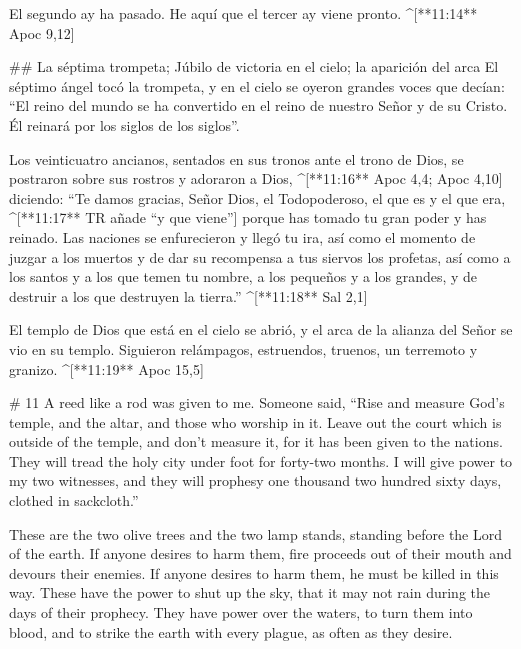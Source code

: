 \begin{paracols}{2}
 El segundo ay ha pasado. He aquí que el tercer ay viene pronto. ^[**11:14** Apoc 9,12]

## La séptima trompeta; Júbilo de victoria en el cielo; la aparición del arca
 El séptimo ángel tocó la trompeta, y en el cielo se oyeron grandes voces que decían: “El reino del mundo se ha convertido en el reino de nuestro Señor y de su Cristo. Él reinará por los siglos de los siglos”.

 Los veinticuatro ancianos, sentados en sus tronos ante el trono de Dios, se postraron sobre sus rostros y adoraron a Dios, ^[**11:16** Apoc 4,4; Apoc 4,10]  diciendo: “Te damos gracias, Señor Dios, el Todopoderoso, el que es y el que era, ^[**11:17** TR añade “y que viene”] porque has tomado tu gran poder y has reinado.  Las naciones se enfurecieron y llegó tu ira, así como el momento de juzgar a los muertos y de dar su recompensa a tus siervos los profetas, así como a los santos y a los que temen tu nombre, a los pequeños y a los grandes, y de destruir a los que destruyen la tierra.” ^[**11:18** Sal 2,1]

 El templo de Dios que está en el cielo se abrió, y el arca de la alianza del Señor se vio en su templo. Siguieron relámpagos, estruendos, truenos, un terremoto y granizo. ^[**11:19** Apoc 15,5]

\switchcolumn
\begin{english}

# 11
 A reed like a rod was given to me. Someone said, “Rise and measure God’s temple, and the altar, and those who worship in it.  Leave out the court which is outside of the temple, and don’t measure it, for it has been given to the nations. They will tread the holy city under foot for forty-two months.  I will give power to my two witnesses, and they will prophesy one thousand two hundred sixty days, clothed in sackcloth.” 

 These are the two olive trees and the two lamp stands, standing before the Lord of the earth.  If anyone desires to harm them, fire proceeds out of their mouth and devours their enemies. If anyone desires to harm them, he must be killed in this way.  These have the power to shut up the sky, that it may not rain during the days of their prophecy. They have power over the waters, to turn them into blood, and to strike the earth with every plague, as often as they desire. 


\end{english}
\end{paracols}
